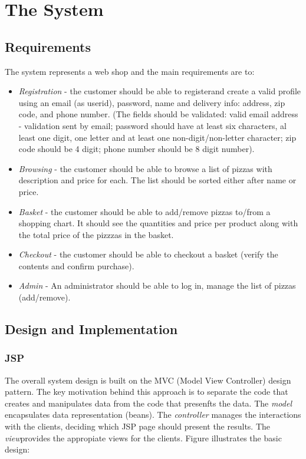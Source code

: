 \section{The System}
\label{sec.thesystem}

\subsection{Requirements}
\label{sec.thesystem_req}
The system represents a web shop and the main requirements are to:
\begin{itemize}
  \item \emph{Registration} - the customer should be able to registerand create
  a valid profile using an email (as userid), password, name and delivery info: address,
  zip code, and phone number. (The fields should be validated: valid email
  address - validation sent by email; password should have at least six
  characters, al least one digit, one letter and at least one
  non-digit/non-letter character; zip code should be 4 digit; phone number
  should be 8 digit number).
  \item \emph{Browsing} - the customer should be able to browse a list of pizzas
  with description and price for each. The list should be sorted either after
  name or price.
  \item \emph{Basket} - the customer should be able to add/remove pizzas
  to/from a shopping chart. It should see the quantities and price per product
  along with the total price of the pizzzas in the basket.
  \item \emph{Checkout} - the customer should be able to checkout a basket
  (verify the contents and confirm purchase).
  \item \emph{Admin} - An administrator should be able to log in, manage the
  list of pizzas (add/remove).
\end{itemize}
\subsection{Design and Implementation}
\label{sec.thesystem.design_impl}

\subsubsection{JSP}
\label{sec.thesystem.jsp}
The overall system design is built on the MVC (Model View Controller) design
pattern. The key motivation behind this approach is to separate the code that
creates and manipulates data from the code that presenfts the data. The
\emph{model} encapsulates data representation (beans). The \emph{controller}
manages the interactions with the clients, deciding which JSP page should
present the results. The \emph{view}provides the appropiate views for the
clients. Figure illustrates the basic design:

